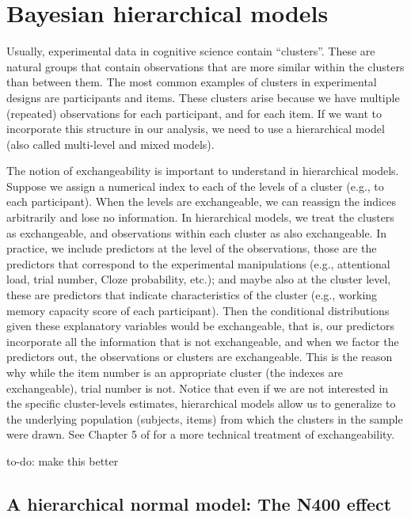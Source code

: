 \documentclass[12pt,]{krantz}
\makeatletter
\newenvironment{kframe}{%
\medskip{}
\setlength{\fboxsep}{.8em}
 \def\at@end@of@kframe{}%
 \ifinner\ifhmode%
  \def\at@end@of@kframe{\end{minipage}}%
  \begin{minipage}{\columnwidth}%
 \fi\fi%
 \def\FrameCommand##1{\hskip\@totalleftmargin \hskip-\fboxsep
 \colorbox{shadecolor}{##1}\hskip-\fboxsep
     \hskip-\linewidth \hskip-\@totalleftmargin \hskip\columnwidth}%
 \MakeFramed {\advance\hsize-\width
   \@totalleftmargin\z@ \linewidth\hsize
   \@setminipage}}%
 {\par\unskip\endMakeFramed%
 \at@end@of@kframe}
\newenvironment{rmdblock}[1]
  {
  \begin{itemize}
  \renewcommand{\labelitemi}{
    \raisebox{-.7\height}[0pt][0pt]{
      {\setkeys{Gin}{width=3em,keepaspectratio}\texttt{[image: images/\#1]}}
    }
  }
  \setlength{\fboxsep}{1em}
  \begin{kframe}
  \item
  }
  {
  \end{kframe}
  \end{itemize}
  }
\newenvironment{rmdnote}
  {\begin{rmdblock}{note}}
  {\end{rmdblock}}
\theoremstyle{definition}
\theoremstyle{definition}
\theoremstyle{definition}
\theoremstyle{remark}
\makeatother
\begin{document}
\chapter{Bayesian hierarchical models}\label{ch:hierarchical}

Usually, experimental data in cognitive science contain ``clusters''.
These are natural groups that contain observations that are more similar
within the clusters than between them. The most common examples of
clusters in experimental designs are participants and items. These
clusters arise because we have multiple (repeated) observations for each
participant, and for each item. If we want to incorporate this structure
in our analysis, we need to use a hierarchical model (also called
multi-level and mixed models).

The notion of exchangeability is important to understand in hierarchical
models. Suppose we assign a numerical index to each of the levels of a
cluster (e.g., to each participant). When the levels are exchangeable,
we can reassign the indices arbitrarily and lose no information. In
hierarchical models, we treat the clusters as exchangeable, and
observations within each cluster as also exchangeable. In practice, we
include predictors at the level of the observations, those are the
predictors that correspond to the experimental manipulations (e.g.,
attentional load, trial number, Cloze probability, etc.); and maybe also
at the cluster level, these are predictors that indicate characteristics
of the cluster (e.g., working memory capacity score of each
participant). Then the conditional distributions given these explanatory
variables would be exchangeable, that is, our predictors incorporate all
the information that is not exchangeable, and when we factor the
predictors out, the observations or clusters are exchangeable. This is
the reason why while the item number is an appropriate cluster (the
indexes are exchangeable), trial number is not. Notice that even if we
are not interested in the specific cluster-levels estimates,
hierarchical models allow us to generalize to the underlying population
(subjects, items) from which the clusters in the sample were drawn. See
Chapter 5 of \citet{Gelman14} for a more technical treatment of
exchangeability.

\begin{rmdnote} to-do: make this better
\end{rmdnote}

\section{A hierarchical normal model: The N400
effect}\label{sec:N400hierarchical}
\end{document}
